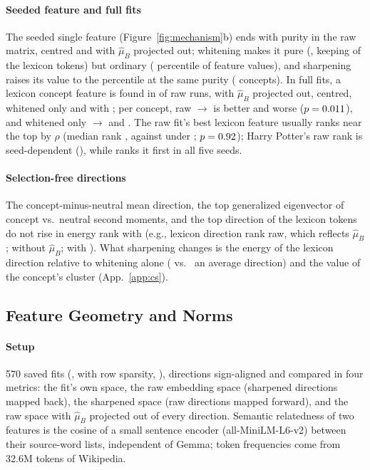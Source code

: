 \paragraph{Seeded feature and full fits}
The seeded single feature (Figure~\ref{fig:mechanism}b) ends with purity  in the raw matrix,  centred and  with $\hat\mu_B$ projected out; whitening makes it pure (, keeping  of the lexicon tokens) but ordinary ( percentile of feature values), and sharpening raises its value to the  percentile at the same purity ( concepts).
In full fits, a lexicon concept feature is found in  of raw runs,  with $\hat\mu_B$ projected out,  centred,  whitened only and  with \cs{}; per concept, raw $\to$ \cs{} is  better and  worse ($p = 0.011$), and whitened only $\to$ \cs{}  and .
The raw fit's best lexicon feature usually ranks near the top by $\rho$ (median rank , against  under \cs{}; $p = 0.92$); Harry Potter's raw rank is seed-dependent (), while \cs{} ranks it first in all five seeds.

\paragraph{Selection-free directions}
The concept-minus-neutral mean direction, the top generalized eigenvector of concept vs.\ neutral second moments, and the top direction of the lexicon tokens do not rise in energy rank with \cs{} (e.g., lexicon direction rank  raw, which reflects $\hat\mu_B$;  without $\hat\mu_B$;  with \cs{}). What sharpening changes is the energy of the lexicon direction relative to whitening alone ( vs.\  an average direction) and the value of the concept's cluster (App.~\ref{app:cs}).

\subsection{Feature Geometry and Norms}
\label{app:geometry}
\paragraph{Setup}
570 saved fits (\ember{}, \cs{} with row sparsity, \cinder{}), directions sign-aligned and compared in four metrics: the fit's own space, the raw embedding space (sharpened directions mapped back), the sharpened space (raw directions mapped forward), and the raw space with $\hat\mu_B$ projected out of every direction. Semantic relatedness of two features is the cosine of a small sentence encoder (all-MiniLM-L6-v2) between their source-word lists, independent of Gemma; token frequencies come from 32.6M tokens of Wikipedia.

